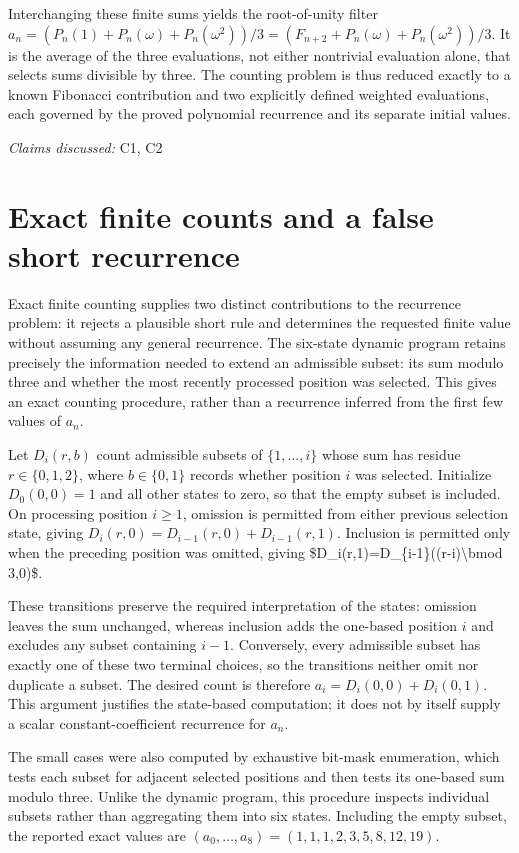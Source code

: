 \documentclass[11pt]{article}
\begin{document}
Interchanging these finite sums yields the root-of-unity filter $a_n=(P_n(1)+P_n(\omega)+P_n(\omega^2))/3=(F_{n+2}+P_n(\omega)+P_n(\omega^2))/3$. It is the average of the three evaluations, not either nontrivial evaluation alone, that selects sums divisible by three. The counting problem is thus reduced exactly to a known Fibonacci contribution and two explicitly defined weighted evaluations, each governed by the proved polynomial recurrence and its separate initial values.

\textit{Claims discussed: }C1, C2
\section{Exact finite counts and a false short recurrence}
Exact finite counting supplies two distinct contributions to the recurrence problem: it rejects a plausible short rule and determines the requested finite value without assuming any general recurrence. The six-state dynamic program retains precisely the information needed to extend an admissible subset: its sum modulo three and whether the most recently processed position was selected. This gives an exact counting procedure, rather than a recurrence inferred from the first few values of $a_n$.

Let $D_i(r,b)$ count admissible subsets of $\{1,\ldots,i\}$ whose sum has residue $r\in\{0,1,2\}$, where $b\in\{0,1\}$ records whether position $i$ was selected. Initialize $D_0(0,0)=1$ and all other states to zero, so that the empty subset is included. On processing position $i\geq1$, omission is permitted from either previous selection state, giving $D_i(r,0)=D_{i-1}(r,0)+D_{i-1}(r,1)$. Inclusion is permitted only when the preceding position was omitted, giving \$D\_i(r,1)=D\_\{i-1\}((r-i)\textbackslash{}bmod 3,0)\$.

These transitions preserve the required interpretation of the states: omission leaves the sum unchanged, whereas inclusion adds the one-based position $i$ and excludes any subset containing $i-1$. Conversely, every admissible subset has exactly one of these two terminal choices, so the transitions neither omit nor duplicate a subset. The desired count is therefore $a_i=D_i(0,0)+D_i(0,1)$. This argument justifies the state-based computation; it does not by itself supply a scalar constant-coefficient recurrence for $a_n$.

The small cases were also computed by exhaustive bit-mask enumeration, which tests each subset for adjacent selected positions and then tests its one-based sum modulo three. Unlike the dynamic program, this procedure inspects individual subsets rather than aggregating them into six states. Including the empty subset, the reported exact values are $(a_0,\ldots,a_8)=(1,1,1,2,3,5,8,12,19)$.
\end{document}
